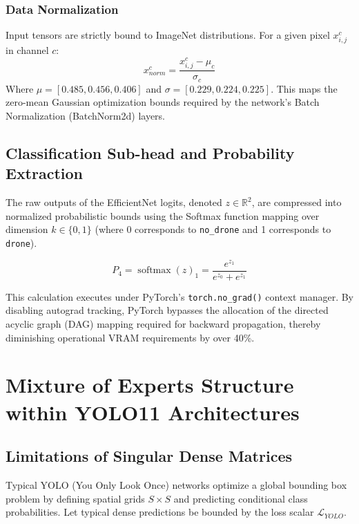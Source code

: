 \documentclass[11pt, letterpaper, oneside, openany]{book}
\DeclareMathOperator{\softmax}{softmax}
\begin{document}
\subsection{Data Normalization}
Input tensors are strictly bound to ImageNet distributions. For a given pixel $x_{i,j}^c$ in channel $c$:
\begin{equation}
    x_{norm}^{c} = \frac{x_{i,j}^c - \mu_c}{\sigma_c}
\end{equation}
Where $\mu = [0.485, 0.456, 0.406]$ and $\sigma = [0.229, 0.224, 0.225]$. This maps the zero-mean Gaussian optimization bounds required by the network's Batch Normalization (BatchNorm2d) layers.

\section{Classification Sub-head and Probability Extraction}
The raw outputs of the EfficientNet logits, denoted $z \in \mathbb{R}^2$, are compressed into normalized probabilistic bounds using the Softmax function mapping over dimension $k \in \{0, 1\}$ (where 0 corresponds to \texttt{no\_drone} and 1 corresponds to \texttt{drone}).

\begin{equation}
    P_4 = \softmax(z)_1 = \frac{e^{z_1}}{e^{z_0} + e^{z_1}}
\end{equation}

This calculation executes under PyTorch's \texttt{torch.no\_grad()} context manager. By disabling autograd tracking, PyTorch bypasses the allocation of the directed acyclic graph (DAG) mapping required for backward propagation, thereby diminishing operational VRAM requirements by over 40\%.

\chapter{Mixture of Experts Structure within YOLO11 Architectures}

\section{Limitations of Singular Dense Matrices}
Typical YOLO (You Only Look Once) networks optimize a global bounding box problem by defining spatial grids $S \times S$ and predicting conditional class probabilities. Let typical dense predictions be bounded by the loss scalar $\mathcal{L}_{YOLO}$. 
\end{document}
